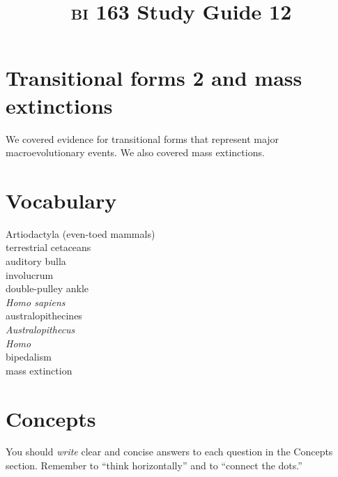 \documentclass[letterpaper]{tufte-handout}
\title{{\scshape bi} 163 Study Guide 12}
\date{} %
\begin{document}
\maketitle	%

\section*{Transitional forms 2 and mass extinctions}

We covered evidence for transitional forms that represent major macroevolutionary events. We also covered mass extinctions.

\section*{Vocabulary}

\vspace{-1\baselineskip}
\begin{multicols}{2}
Artiodactyla (even-toed mammals) \\
terrestrial cetaceans \\
auditory bulla \\
involucrum \\
double-pulley ankle \\
\textit{Homo sapiens} \\
australopithecines \\
\textit{Australopithecus} \\
\textit{Homo} \\
bipedalism \\
mass extinction \\
\end{multicols}

\section*{Concepts}

You should \emph{write} clear and concise answers to each question in the Concepts section.  Remember to ``think horizontally'' and to ``connect the dots.'' \vspace*{\baselineskip}
\end{document}
